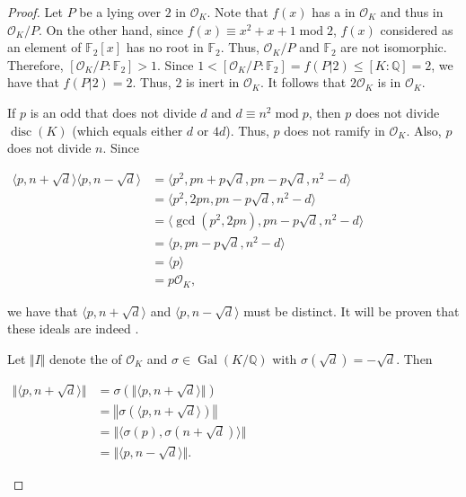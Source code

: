 \documentclass[12pt]{article}
\begin{document}
\begin{proof}
Let $P$ be a  lying over $2$ in $\mathcal{O}_K$.  Note that $f(x)$ has a  in $\mathcal{O}_K$ and thus in $\mathcal{O}_K/P$.  On the other hand, since $f(x) \equiv x^2+x+1 \operatorname{mod} 2$, $f(x)$ considered as an element of $\mathbb{F}_2[x]$ has no root in $\mathbb{F}_2$.  Thus, $\mathcal{O}_K/P$ and $\mathbb{F}_2$ are not isomorphic.  Therefore, $[\mathcal{O}_K/P \!:\! \mathbb{F}_2]>1$.  Since $1<[\mathcal{O}_K/P \!:\! \mathbb{F}_2]=f(P|2) \le [K \!:\! \mathbb{Q}]=2$, we have that $f(P|2)=2$.  Thus, $2$ is inert in $\mathcal{O}_K$.  It follows that $2\mathcal{O}_K$ is  in $\mathcal{O}_K$.

If $p$ is an odd  that does not divide $d$ and $d \equiv n^2 \operatorname{mod} p$, then $p$ does not divide $\operatorname{disc}(K)$ (which equals either $d$ or $4d$).  Thus, $p$ does not ramify in $\mathcal{O}_K$.  Also, $p$ does not divide $n$.  Since

\begin{center}
$\begin{array}{ll}
\langle p, n+\sqrt{d} \rangle \langle p, n-\sqrt{d} \rangle & = \langle p^2, pn+p\sqrt{d}, pn-p\sqrt{d}, n^2-d \rangle \\
& = \langle p^2, 2pn, pn-p\sqrt{d}, n^2-d \rangle \\
& = \langle \gcd(p^2,2pn), pn-p\sqrt{d}, n^2-d \rangle \\
& = \langle p, pn-p\sqrt{d}, n^2-d \rangle \\
& = \langle p \rangle \\
& = p\mathcal{O}_K, \end{array}$
\end{center}

we have that $\langle p, n+\sqrt{d} \rangle$ and $\langle p, n-\sqrt{d} \rangle$ must be distinct.  It will be proven that these ideals are indeed .

Let $\Vert I \Vert$ denote the  of $\mathcal{O}_K$ and $\sigma \in \operatorname{Gal}(K/\mathbb{Q})$ with $\sigma(\sqrt{d})=-\sqrt{d}$.  Then

\begin{center}
$\begin{array}{ll}
\Vert \langle p, n+\sqrt{d} \rangle \Vert & = \sigma \left( \Vert \langle p, n+\sqrt{d} \rangle \Vert \right) \\
& = \left\Vert \sigma \left( \langle p, n+\sqrt{d} \rangle \right) \right\Vert \\
& = \Vert \langle \sigma(p), \sigma(n+\sqrt{d}) \rangle \Vert \\
& = \Vert \langle p,n-\sqrt{d} \rangle \Vert. \end{array}$
\end{center}


\end{proof}
\end{document}
